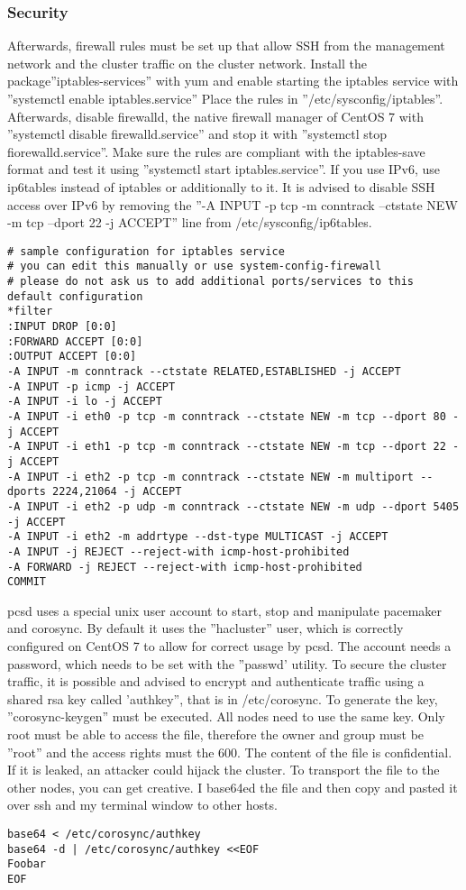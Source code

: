 \subsubsection{Security}
Afterwards, firewall rules must be set up that allow SSH from the management network
and the cluster traffic on the cluster network. Install the package''iptables-services'' with
yum and enable starting the iptables service with ''systemctl enable iptables.service''
Place the rules in ''/etc/sysconfig/iptables''. 
Afterwards, disable firewalld, the native firewall manager of CentOS 7 with ''systemctl disable firewalld.service''
and stop it with ''systemctl stop fiorewalld.service''.
Make sure the rules are compliant with the iptables-save format and test it using 
''systemctl start iptables.service''. 
If you use IPv6, use ip6tables instead of iptables or additionally to it. It is advised to disable SSH access over IPv6
by removing the ''-A INPUT -p tcp -m conntrack --ctstate NEW -m tcp --dport 22 -j ACCEPT'' line from /etc/sysconfig/ip6tables.
\begin{lstlisting}
# sample configuration for iptables service
# you can edit this manually or use system-config-firewall
# please do not ask us to add additional ports/services to this default configuration
*filter
:INPUT DROP [0:0]
:FORWARD ACCEPT [0:0]
:OUTPUT ACCEPT [0:0]
-A INPUT -m conntrack --ctstate RELATED,ESTABLISHED -j ACCEPT
-A INPUT -p icmp -j ACCEPT
-A INPUT -i lo -j ACCEPT
-A INPUT -i eth0 -p tcp -m conntrack --ctstate NEW -m tcp --dport 80 -j ACCEPT
-A INPUT -i eth1 -p tcp -m conntrack --ctstate NEW -m tcp --dport 22 -j ACCEPT
-A INPUT -i eth2 -p tcp -m conntrack --ctstate NEW -m multiport --dports 2224,21064 -j ACCEPT
-A INPUT -i eth2 -p udp -m conntrack --ctstate NEW -m udp --dport 5405 -j ACCEPT
-A INPUT -i eth2 -m addrtype --dst-type MULTICAST -j ACCEPT
-A INPUT -j REJECT --reject-with icmp-host-prohibited
-A FORWARD -j REJECT --reject-with icmp-host-prohibited
COMMIT
\end{lstlisting}
pcsd uses a special unix user account to start, stop and manipulate pacemaker
and corosync. By default it uses the ''hacluster'' user, which is correctly
configured on CentOS 7 to allow for correct usage by pcsd.
The account needs a password, which needs to be set with the ''passwd' utility.
To secure the cluster traffic, it is possible and advised to encrypt and authenticate
traffic using a shared rsa key called 'authkey'', that is in /etc/corosync.
To generate the key, ''corosync-keygen'' must be executed. All nodes need to use the same key.
Only root must be able to access the file, therefore the owner and group must be ''root''
and the access rights must the 600. The content of the file is confidential. If it is leaked,
an attacker could hijack the cluster. To transport the file to the other nodes, you
can get creative. I base64ed the file and then copy and pasted it over ssh and my
terminal window to other hosts.
\begin{lstlisting}
base64 < /etc/corosync/authkey
base64 -d | /etc/corosync/authkey <<EOF 
Foobar
EOF
\end{lstlisting}
